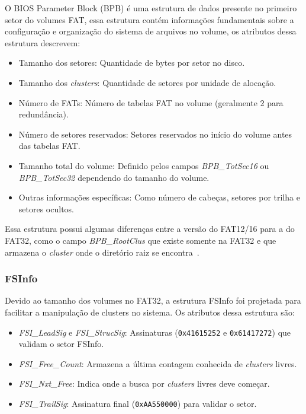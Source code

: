 \documentclass[
    12pt,				%
    oneside,   	        %
    a4paper,			%
    english,			%
    french,				%
    spanish,			%
    brazil,				%
    ]{pacotes/abntex2}
\begin{document}
O BIOS Parameter Block (BPB) é uma estrutura de dados presente no primeiro setor do volumes FAT, essa estrutura contém informações fundamentais sobre a configuração e organização do sistema de arquivos no volume, os atributos dessa estrutura descrevem:

\begin{itemize}
    \item Tamanho dos setores: Quantidade de bytes por setor no disco.
    \item Tamanho dos \textit{clusters}: Quantidade de setores por unidade de alocação.
    \item Número de FATs: Número de tabelas FAT no volume (geralmente 2 para redundância).
    \item Número de setores reservados: Setores reservados no início do volume antes das tabelas FAT.
    \item Tamanho total do volume: Definido pelos campos \textit{BPB\_TotSec16} ou \textit{BPB\_TotSec32} dependendo do tamanho do volume.
    \item Outras informações específicas: Como número de cabeças, setores por trilha e setores ocultos.
\end{itemize}

Essa estrutura possui algumas diferenças entre a versão do FAT12/16 para a do FAT32, como o campo \textit{BPB\_RootClus} que existe somente na FAT32 e que armazena o \textit{cluster} onde o diretório raiz se encontra~\cite{microsoft2000}.

\subsubsection{FSInfo}
\label{subsubsec:fsinfo}

Devido ao tamanho dos volumes no FAT32, a estrutura FSInfo foi projetada para facilitar a manipulação de clusters no sistema. Os atributos dessa estrutura são:

\begin{itemize}
    \item \textit{FSI\_LeadSig} e \textit{FSI\_StrucSig}: Assinaturas (\texttt{0x41615252} e \texttt{0x61417272}) que validam o setor FSInfo.
    \item \textit{FSI\_Free\_Count}: Armazena a última contagem conhecida de \textit{clusters} livres.
    \item \textit{FSI\_Nxt\_Free}: Indica onde a busca por \textit{clusters} livres deve começar.
    \item \textit{FSI\_TrailSig}: Assinatura final (\texttt{0xAA550000}) para validar o setor.
\end{itemize}
\end{document}
